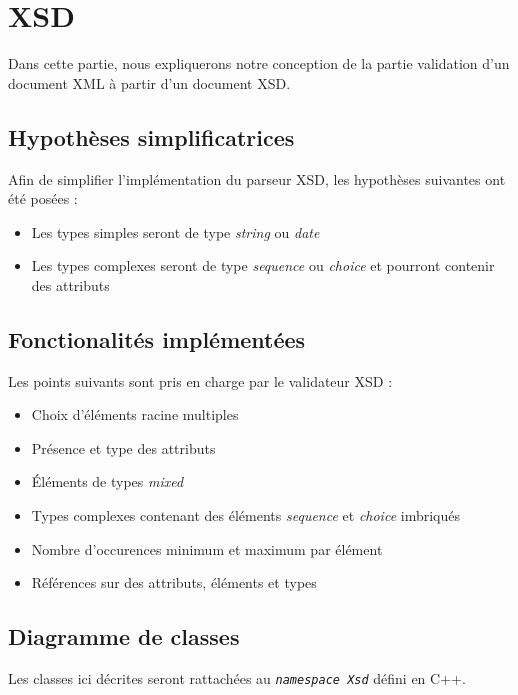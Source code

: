 \chapter{XSD}

Dans cette partie, nous expliquerons notre conception de la partie validation d'un document XML à partir d'un document XSD.

\section{Hypothèses simplificatrices}
	Afin de simplifier l'implémentation du parseur XSD, les hypothèses suivantes ont été posées :
	\begin{itemize}
		\item{Les types simples seront de type \textit{string} ou \textit{date}}
		\item{Les types complexes seront de type \textit{sequence} ou \textit{choice} et pourront contenir des attributs}
	\end{itemize}

\section{Fonctionalités implémentées}
Les points suivants sont pris en charge par le validateur XSD :
\begin{itemize}
    \item{Choix d'éléments racine multiples}
    \item{Présence et type des attributs}
    \item{Éléments de types \textit{mixed}}
    \item{Types complexes contenant des éléments \textit{sequence} et \textit{choice} imbriqués}
    \item{Nombre d'occurences minimum et maximum par élément}
    \item{Références sur des attributs, éléments et types}
\end{itemize}

\section{Diagramme de classes}
Les classes ici décrites seront rattachées au \textit{\lstinline$namespace Xsd$} défini en C++.

